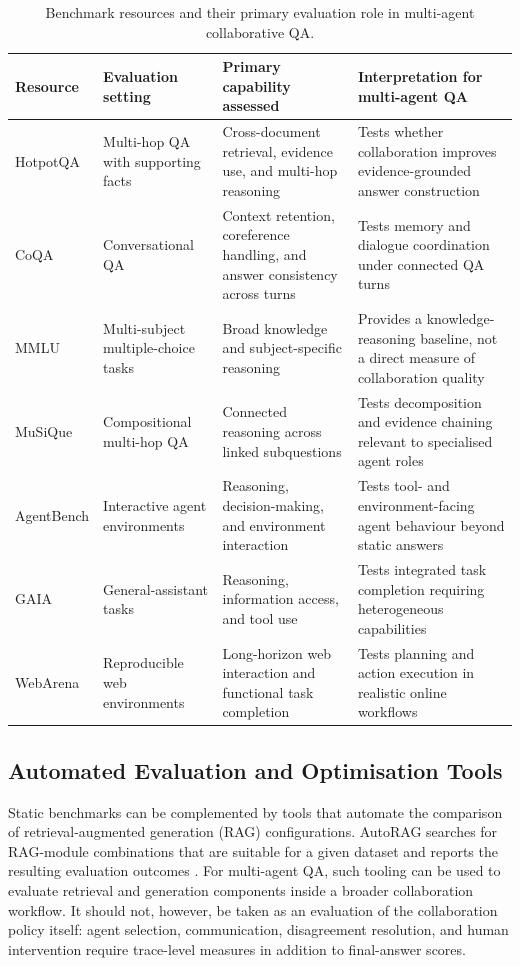 \begin{table}[t]
  \centering
  \caption{Benchmark resources and their primary evaluation role in multi-agent collaborative QA.}
  \label{tab:benchmark_resources}
  \small
  \begin{tabularx}{\textwidth}{p{2.3cm} p{2.6cm} X X}
    \toprule
    \textbf{Resource} & \textbf{Evaluation setting} & \textbf{Primary capability assessed} & \textbf{Interpretation for multi-agent QA} \\
    \midrule
    HotpotQA & Multi-hop QA with supporting facts & Cross-document retrieval, evidence use, and multi-hop reasoning & Tests whether collaboration improves evidence-grounded answer construction \\
    CoQA & Conversational QA & Context retention, coreference handling, and answer consistency across turns & Tests memory and dialogue coordination under connected QA turns \\
    MMLU & Multi-subject multiple-choice tasks & Broad knowledge and subject-specific reasoning & Provides a knowledge-reasoning baseline, not a direct measure of collaboration quality \\
    MuSiQue & Compositional multi-hop QA & Connected reasoning across linked subquestions & Tests decomposition and evidence chaining relevant to specialised agent roles \\
    AgentBench & Interactive agent environments & Reasoning, decision-making, and environment interaction & Tests tool- and environment-facing agent behaviour beyond static answers \\
    GAIA & General-assistant tasks & Reasoning, information access, and tool use & Tests integrated task completion requiring heterogeneous capabilities \\
    WebArena & Reproducible web environments & Long-horizon web interaction and functional task completion & Tests planning and action execution in realistic online workflows \\
    \bottomrule
  \end{tabularx}
\end{table}

\subsection{Automated Evaluation and Optimisation Tools}
\label{sec:automated_evaluation_tools}

Static benchmarks can be complemented by tools that automate the comparison
of retrieval-augmented generation (RAG) configurations. AutoRAG searches for
RAG-module combinations that are suitable for a given dataset and reports
the resulting evaluation outcomes \citep{autorag2024}. For multi-agent QA,
such tooling can be used to evaluate retrieval and generation components
inside a broader collaboration workflow. It should not, however, be taken as
an evaluation of the collaboration policy itself: agent selection,
communication, disagreement resolution, and human intervention require
trace-level measures in addition to final-answer scores.

